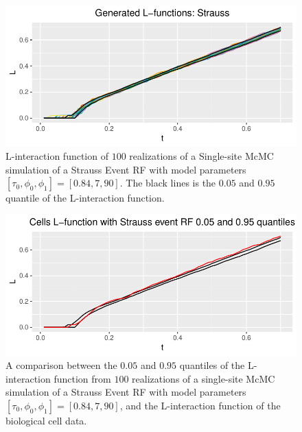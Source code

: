 \begin{figure}
    \centering
    \includegraphics[scale=0.9]{figures/gen_strauss_l.pdf}
    \caption{L-interaction function of $100$ realizations of a Single-site McMC simulation of a Strauss Event RF with model parameters $[\tau_0,\phi_0,\phi_1] = [0.84,7,90]$. The black lines is the $0.05$ and $0.95$ quantile of the L-interaction function.}
    \label{fig:gen_strauss_l}
\end{figure}

\begin{figure}
    \centering
    \includegraphics[scale=0.9]{figures/strauss_quant1.pdf}
    \caption{A comparison between the $0.05$ and $0.95$ quantiles of the L-interaction function from $100$ realizations of a single-site McMC simulation of a Strauss Event RF with model parameters $[\tau_0,\phi_0,\phi_1] = [0.84,7,90]$, and the L-interaction function of the biological cell data.}
    \label{fig:strauss_quant1}
\end{figure}

